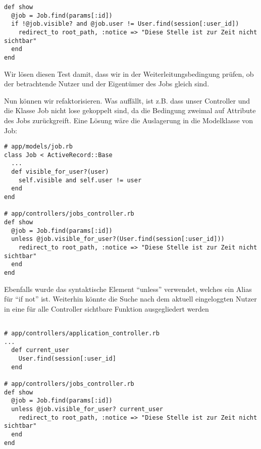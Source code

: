 \begin{lstlisting}
def show
  @job = Job.find(params[:id])
  if !@job.visible? and @job.user != User.find(session[:user_id])
    redirect_to root_path, :notice => "Diese Stelle ist zur Zeit nicht sichtbar"
  end
end
\end{lstlisting}
\tddgreen
Wir lösen diesen Test damit, dass wir in der Weiterleitungsbedingung prüfen, ob der betrachtende Nutzer und der Eigentümer des Jobs gleich sind.

Nun können wir refaktorisieren. Was auffällt, ist z.B. dass unser Controller und die Klasse Job nicht lose gekoppelt sind, da die Bedingung zweimal auf Attribute des Jobs zurückgreift. Eine Lösung wäre die Auslagerung in die Modelklasse von Job:
\tddrefactor
\begin{lstlisting}
# app/models/job.rb
class Job < ActiveRecord::Base
  ...
  def visible_for_user?(user)
    self.visible and self.user != user
  end 
end

# app/controllers/jobs_controller.rb 
def show
  @job = Job.find(params[:id])
  unless @job.visible_for_user?(User.find(session[:user_id]))
    redirect_to root_path, :notice => "Diese Stelle ist zur Zeit nicht sichtbar"
  end
end
\end{lstlisting}
Ebenfalls wurde das syntaktische Element "`unless"' verwendet, welches ein Alias für "`if not"' ist.
Weiterhin könnte die Suche nach dem aktuell eingeloggten Nutzer in eine für alle Controller sichtbare Funktion ausgegliedert werden
\tddrefactor
\begin{lstlisting}

# app/controllers/application_controller.rb
...
  def current_user
    User.find(session[:user_id]
  end

# app/controllers/jobs_controller.rb 
def show
  @job = Job.find(params[:id])
  unless @job.visible_for_user? current_user
    redirect_to root_path, :notice => "Diese Stelle ist zur Zeit nicht sichtbar"
  end
end
\end{lstlisting}


